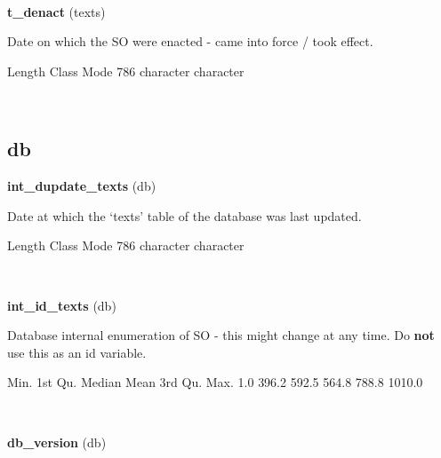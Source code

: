 \documentclass[]{article}
\newenvironment{Shaded}{\begin{snugshade}}{\end{snugshade}}
\newcommand{\DecValTok}[1]{\textcolor[rgb]{0.00,0.00,0.81}{{#1}}}
\newcommand{\FloatTok}[1]{\textcolor[rgb]{0.00,0.00,0.81}{{#1}}}
\newcommand{\NormalTok}[1]{{#1}}
\begin{document}
~

\vspace{1em}

\textbf{t\_denact} (texts)

Date on which the SO were enacted - came into force / took effect.

\begin{Shaded}
\begin{Highlighting}[]
   \NormalTok{Length     Class      Mode }
      \DecValTok{786} \NormalTok{character character }
\end{Highlighting}
\end{Shaded}

~

\vspace{1em}

\subsection{db}\label{db}

\textbf{int\_dupdate\_texts} (db)

Date at which the `texts' table of the database was last updated.

\begin{Shaded}
\begin{Highlighting}[]
   \NormalTok{Length     Class      Mode }
      \DecValTok{786} \NormalTok{character character }
\end{Highlighting}
\end{Shaded}

~

\vspace{1em}

\textbf{int\_id\_texts} (db)

Database internal enumeration of SO - this might change at any time. Do
\textbf{not} use this as an id variable.

\begin{Shaded}
\begin{Highlighting}[]
   \NormalTok{Min. 1st Qu.  Median    Mean 3rd Qu.    Max. }
    \FloatTok{1.0}   \FloatTok{396.2}   \FloatTok{592.5}   \FloatTok{564.8}   \FloatTok{788.8}  \FloatTok{1010.0} 
\end{Highlighting}
\end{Shaded}

~

\vspace{1em}

\textbf{db\_version} (db)
\end{document}
